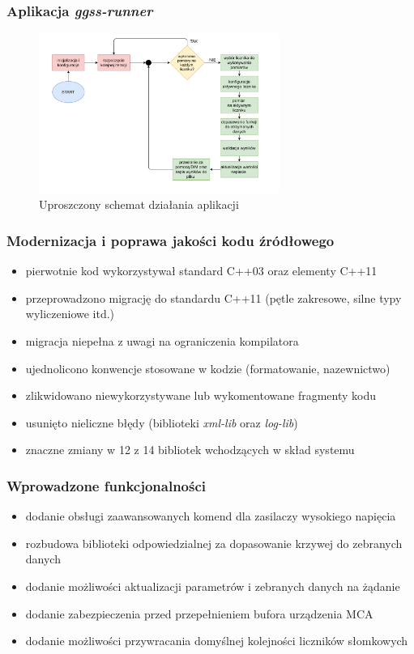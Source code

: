 \documentclass[10pt]{beamer}
\begin{document}
\begin{frame}
\frametitle{Aplikacja \emph{ggss-runner}}
\begin{figure}
\includegraphics[width=0.7\textwidth]{static/flow.pdf}
\caption{Uproszczony schemat działania aplikacji}
\end{figure}
\end{frame}

\begin{frame}
\frametitle{Modernizacja i poprawa jakości kodu źródłowego}
\begin{itemize}
    \item pierwotnie kod wykorzystywał standard C++03 oraz elementy C++11
    \item przeprowadzono migrację do standardu C++11 (pętle zakresowe, silne typy wyliczeniowe itd.)
    \item migracja niepełna z uwagi na ograniczenia kompilatora
    \item ujednolicono konwencje stosowane w kodzie (formatowanie, nazewnictwo)
    \item zlikwidowano niewykorzystywane lub wykomentowane fragmenty kodu
    \item usunięto nieliczne błędy (biblioteki \emph{xml-lib} oraz \emph{log-lib})
    \item znaczne zmiany w 12 z 14 bibliotek wchodzących w skład systemu
\end{itemize}
\end{frame}

\begin{frame}
\frametitle{Wprowadzone funkcjonalności}
\begin{itemize}
    \item dodanie obsługi zaawansowanych komend dla zasilaczy wysokiego napięcia
    \item rozbudowa biblioteki odpowiedzialnej za dopasowanie krzywej do zebranych danych
    \item dodanie możliwości aktualizacji parametrów i zebranych danych na żądanie
    \item dodanie zabezpieczenia przed przepełnieniem bufora urządzenia MCA
    \item dodanie możliwości przywracania domyślnej kolejności liczników słomkowych
\end{itemize}
\end{frame}
\end{document}
